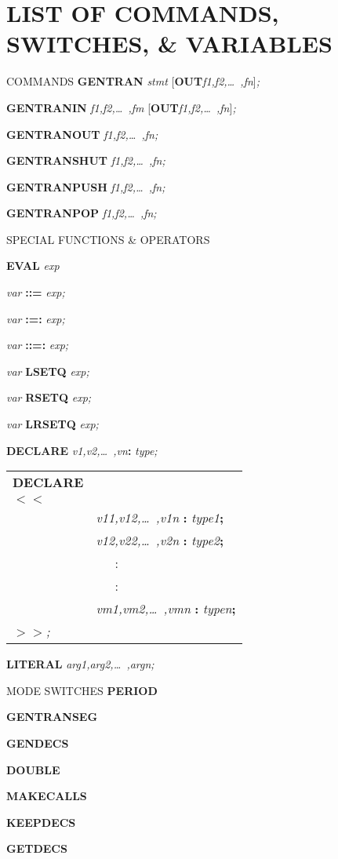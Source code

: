 \chapter{LIST OF COMMANDS, SWITCHES, \& VARIABLES}
\begin{describe}{COMMANDS}
{\bf GENTRAN} {\it stmt\/} [{\bf OUT}{\it  f1,f2,\dots\ ,fn\/}]{\it ;}

{\bf GENTRANIN} {\it f1,f2,\dots\ ,fm\/} [{\bf OUT}{\it  f1,f2,\dots\ ,fn\/}]{\it ;}

{\bf GENTRANOUT} {\it f1,f2,\dots\ ,fn;}

{\bf GENTRANSHUT} {\it f1,f2,\dots\ ,fn;}

{\bf GENTRANPUSH} {\it f1,f2,\dots\ ,fn;}

{\bf GENTRANPOP} {\it f1,f2,\dots\ ,fn;}
\end{describe}

\begin{describe}{SPECIAL FUNCTIONS \& OPERATORS}

{\bf EVAL} {\it exp}

{\it var} {\bf ::=} {\it exp;}

{\it var} {\bf :=:} {\it exp;}

{\it var} {\bf ::=:} {\it exp;}

{\it var} {\bf LSETQ} {\it exp;}

{\it var} {\bf RSETQ} {\it exp;}

{\it var} {\bf LRSETQ} {\it exp;}

{\bf DECLARE} {\it v1,v2,\dots\ ,vn\/}{\bf :} {\it  type;}

\begin{tabular}{ll}
{\bf DECLARE}\\
{\bf $<$$<$}\\
&{\it v11,v12,\dots\ ,v1n} {\bf :} {\it type1\/}{\bf ;}\\
&{\it v12,v22,\dots\ ,v2n} {\bf :} {\it type2\/}{\bf ;}\\
& \ \ \ :\\
& \ \ \ :\\
&{\it vm1,vm2,\dots\ ,vmn} {\bf :} {\it typen\/}{\bf ;}\\
{\bf $>$$>$}{\it ;}
\end{tabular}

{\bf LITERAL} {\it arg1,arg2,\dots\ ,argn;}
\end{describe}

\begin{describe}{MODE SWITCHES}
{\bf PERIOD}

{\bf GENTRANSEG}

{\bf GENDECS}

{\bf DOUBLE}

{\bf MAKECALLS}

{\bf KEEPDECS}

{\bf GETDECS}

\end{describe}

